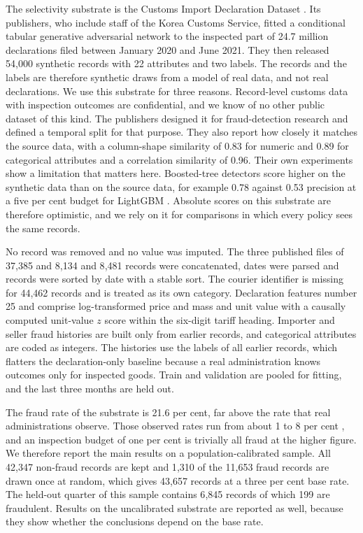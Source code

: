 \documentclass[information,article,submit,moreauthors]{Definitions/mdpi}
\begin{document}
The selectivity substrate is the Customs Import Declaration Dataset \cite{jeong2022dataset}. Its publishers, who include staff of the Korea Customs Service, fitted a conditional tabular generative adversarial network to the inspected part of 24.7 million declarations filed between January 2020 and June 2021. They then released 54{,}000 synthetic records with 22 attributes and two labels. The records and the labels are therefore synthetic draws from a model of real data, and not real declarations. We use this substrate for three reasons. Record-level customs data with inspection outcomes are confidential, and we know of no other public dataset of this kind. The publishers designed it for fraud-detection research and defined a temporal split for that purpose. They also report how closely it matches the source data, with a column-shape similarity of 0.83 for numeric and 0.89 for categorical attributes and a correlation similarity of 0.96. Their own experiments show a limitation that matters here. Boosted-tree detectors score higher on the synthetic data than on the source data, for example 0.78 against 0.53 precision at a five per cent budget for LightGBM \cite{jeong2022dataset}. Absolute scores on this substrate are therefore optimistic, and we rely on it for comparisons in which every policy sees the same records.

No record was removed and no value was imputed. The three published files of 37{,}385 and 8{,}134 and 8{,}481 records were concatenated, dates were parsed and records were sorted by date with a stable sort. The courier identifier is missing for 44{,}462 records and is treated as its own category. Declaration features number 25 and comprise log-transformed price and mass and unit value with a causally computed unit-value $z$ score within the six-digit tariff heading. Importer and seller fraud histories are built only from earlier records, and categorical attributes are coded as integers. The histories use the labels of all earlier records, which flatters the declaration-only baseline because a real administration knows outcomes only for inspected goods. Train and validation are pooled for fitting, and the last three months are held out.

The fraud rate of the substrate is 21.6 per cent, far above the rate that real administrations observe. Those observed rates run from about 1 to 8 per cent \cite{singh2023graphfc}, and an inspection budget of one per cent is trivially all fraud at the higher figure. We therefore report the main results on a population-calibrated sample. All 42{,}347 non-fraud records are kept and 1{,}310 of the 11{,}653 fraud records are drawn once at random, which gives 43{,}657 records at a three per cent base rate. The held-out quarter of this sample contains 6{,}845 records of which 199 are fraudulent. Results on the uncalibrated substrate are reported as well, because they show whether the conclusions depend on the base rate.
\end{document}

